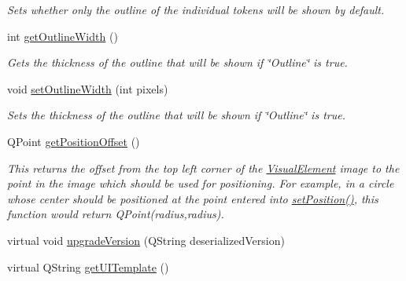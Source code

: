 \begin{DoxyCompactItemize}
\begin{DoxyCompactList}\small\item\em Sets whether only the outline of the individual tokens will be shown by default. \end{DoxyCompactList}\item 
\hypertarget{class_picto_1_1_token_tray_graphic_a2c2a13229cab7c0757a4ad3687c8b967}{int \hyperlink{class_picto_1_1_token_tray_graphic_a2c2a13229cab7c0757a4ad3687c8b967}{get\-Outline\-Width} ()}\label{class_picto_1_1_token_tray_graphic_a2c2a13229cab7c0757a4ad3687c8b967}

\begin{DoxyCompactList}\small\item\em Gets the thickness of the outline that will be shown if \char`\"{}\-Outline\char`\"{} is true. \end{DoxyCompactList}\item 
\hypertarget{class_picto_1_1_token_tray_graphic_a6aa405e5ef49491b304abdb327c0c1c0}{void \hyperlink{class_picto_1_1_token_tray_graphic_a6aa405e5ef49491b304abdb327c0c1c0}{set\-Outline\-Width} (int pixels)}\label{class_picto_1_1_token_tray_graphic_a6aa405e5ef49491b304abdb327c0c1c0}

\begin{DoxyCompactList}\small\item\em Sets the thickness of the outline that will be shown if \char`\"{}\-Outline\char`\"{} is true. \end{DoxyCompactList}\item 
\hypertarget{class_picto_1_1_token_tray_graphic_a4426c7825d2ccd63117ed0adbe09395c}{Q\-Point \hyperlink{class_picto_1_1_token_tray_graphic_a4426c7825d2ccd63117ed0adbe09395c}{get\-Position\-Offset} ()}\label{class_picto_1_1_token_tray_graphic_a4426c7825d2ccd63117ed0adbe09395c}

\begin{DoxyCompactList}\small\item\em This returns the offset from the top left corner of the \hyperlink{struct_picto_1_1_visual_element}{Visual\-Element} image to the point in the image which should be used for positioning. For example, in a circle whose center should be positioned at the point entered into \hyperlink{struct_picto_1_1_visual_element_a454cc96862097e96a0b0f1d2c83e23ed}{set\-Position()}, this function would return Q\-Point(radius,radius). \end{DoxyCompactList}\item 
virtual void \hyperlink{class_picto_1_1_token_tray_graphic_a5ec79aa5e8ba418a86fccff306788b25}{upgrade\-Version} (Q\-String deserialized\-Version)
\item 
\hypertarget{class_picto_1_1_token_tray_graphic_a3fde5ccaaf6068f3ebd7c080c40986d5}{virtual Q\-String \hyperlink{class_picto_1_1_token_tray_graphic_a3fde5ccaaf6068f3ebd7c080c40986d5}{get\-U\-I\-Template} ()}\label{class_picto_1_1_token_tray_graphic_a3fde5ccaaf6068f3ebd7c080c40986d5}


\end{DoxyCompactItemize}
